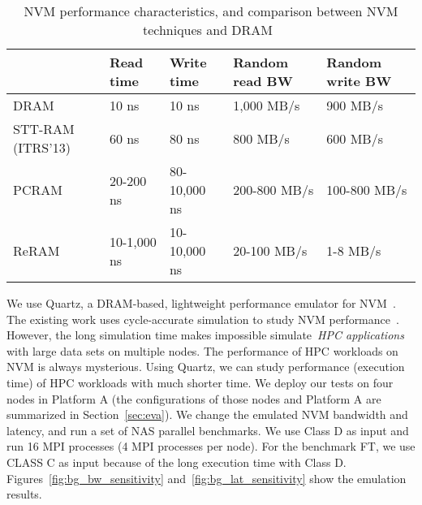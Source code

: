 \begin{table}
        \tiny
        \begin{center}
            \caption{NVM performance characteristics, and comparison between NVM techniques and DRAM~\cite{NVMDB}}
            \vspace{-10pt}
       \label{tab:nvm_features}
       \begin{tabular}{|p{0.8cm}|p{1.2cm}|p{1.2cm}|p{1.5cm}|p{1.5cm}|}
       \hline
              & \textbf{Read time}  & \textbf{Write time} &   \textbf{Random read BW} & \textbf{Random write BW}    \\ \hline \hline
                                              DRAM       & 10 ns    & 10 ns & 1,000 MB/s & 900 MB/s        \\\hline
                                              STT-RAM (ITRS'13)      & 60 ns & 80 ns & 800 MB/s & 600 MB/s                                  \\ \hline
                                              PCRAM        & 20-200 ns & 80-10,000 ns & 200-800 MB/s & 100-800 MB/s                            \\ \hline
                                            ReRAM       & 10-1,000 ns & 10-10,000 ns & 20-100 MB/s & 1-8 MB/s            \\ \hline
      \end{tabular}
      \end{center}
      \vspace{-10pt}
\end{table}


We use Quartz, a DRAM-based, lightweight performance emulator for NVM~\cite{middleware15:volos}. %
The existing work uses cycle-accurate simulation to study NVM performance~\cite{nvm_ipdps12, hpdc16:wu}.
However, the long simulation time makes impossible simulate~\textit{HPC applications} with large data sets on multiple nodes.
The performance of HPC workloads on NVM is always mysterious.
Using Quartz, we can study performance (execution time) of HPC workloads with much shorter time. 
We deploy our tests on four nodes in Platform A (the configurations of those nodes and Platform A are summarized in Section~\ref{sec:eva}).
We change the emulated NVM bandwidth and latency, and run a set of NAS parallel benchmarks. We use Class D as input and run 16 MPI processes (4 MPI processes per node). For the benchmark FT, we use CLASS C as input because of the long execution time with Class D.  Figures~\ref{fig:bg_bw_sensitivity} and~\ref{fig:bg_lat_sensitivity} show the emulation results.


